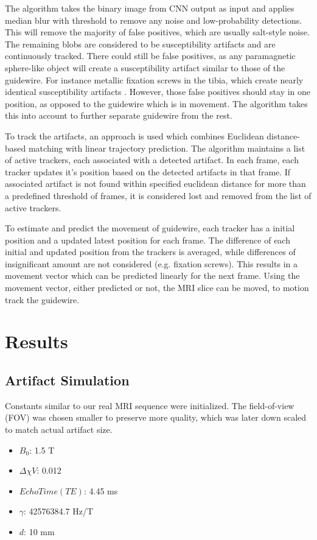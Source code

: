 \documentclass[conference]{IEEEtran}
\begin{document}
The algorithm takes the binary image from CNN output as input and applies median blur with threshold to remove any noise and low-probability detections. This will remove the majority of false positives, which are usually salt-style noise. The remaining blobs are considered to be susceptibility artifacts and are continuously tracked. There could still be false positives, as any paramagnetic sphere-like object will create a susceptibility artifact similar to those of the guidewire. For instance metallic fixation screws in the tibia, which create nearly identical susceptibility artifacts \cite{pmid22162977}. However, those false positives should stay in one position, as opposed to the guidewire which is in movement. The algorithm takes this into account to further separate guidewire from the rest.

To track the artifacts, an approach is used which combines Euclidean distance-based matching with linear trajectory prediction. The algorithm maintains a list of active trackers, each associated with a detected artifact. In each frame, each tracker updates it's position based on the detected artifacts in that frame. If associated artifact is not found within specified euclidean distance for more than a predefined threshold of frames, it is considered lost and removed from the list of active trackers.

To estimate and predict the movement of guidewire, each tracker has a initial position and a updated latest position for each frame. The difference of each initial and updated position from the trackers is averaged, while differences of insignificant amount are not considered (e.g. fixation screws). This results in a movement vector which can be predicted linearly for the next frame. Using the movement vector, either predicted or not, the MRI slice can be moved, to motion track the guidewire. 

\section{Results}

\subsection{Artifact Simulation}

Constants similar to our real MRI sequence were initialized. The field-of-view (FOV) was chosen smaller to preserve more quality, which was later down scaled to match actual artifact size.
\begin{itemize} 
    \item \(B_0\): 1.5 T
    \item \(\Delta{\chi} V\): 0.012
    \item \(Echo Time (TE)\): 4.45 ms
    \item \(\gamma\): 42576384.7 Hz/T
    \item \(d\): 10 mm
\end{itemize}
\end{document}
